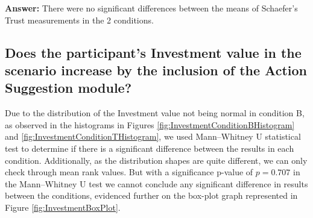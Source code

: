 \textbf{Answer:} There were no significant differences between the means of Schaefer's Trust measurements in the 2 conditions.


\subsection*{Does the participant's Investment value in the scenario increase by the inclusion of the Action Suggestion module?}
Due to the distribution of the Investment value not being normal in condition B, as observed in the histograms in Figures \ref{fig:InvestmentConditionBHistogram} and \ref{fig:InvestmentConditionTHistogram}, we used Mann–Whitney U statistical test to determine if there is a significant difference between the results in each condition. Additionally, as the distribution shapes are quite different, we can only check through mean rank values. But with a significance p-value of $p=0.707$ in the Mann–Whitney U test we cannot conclude any significant difference in results between the conditions, evidenced further on the box-plot graph represented in Figure \ref{fig:InvestmentBoxPlot}.


